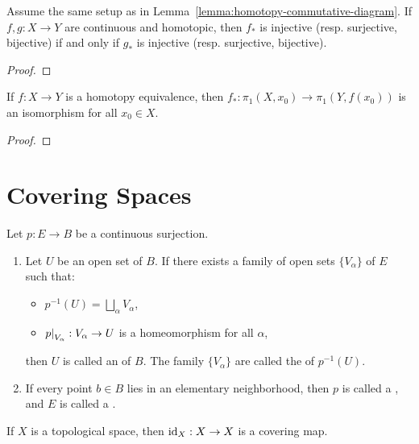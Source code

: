 \begin{corollary}
	Assume the same setup as in Lemma~\ref{lemma:homotopy-commutative-diagram}. If $f,g:X \rightarrow Y$ are continuous and homotopic, then  $f_\ast$ is injective (resp. surjective, bijective) if and only if  $g_\ast$ is injective (resp. surjective, bijective).
\end{corollary}

{\color{red}\begin{proof}
	
\end{proof}}

\begin{theorem}
	If $f:X \rightarrow Y$ is a homotopy equivalence, then $f_\ast:\pi_1(X,x_0) \rightarrow \pi_1(Y,f(x_0))$ is an isomorphism for all $x_0 \in X$.
\end{theorem}
{\color{red}\begin{proof}
	
\end{proof}}

\section{Covering Spaces}

\begin{definition}
	Let $p:E \rightarrow B$ be a  continuous surjection.
	\begin{enumerate}[label = (\alph*),itemsep=1pt,topsep=3pt]
		\item Let $U$ be an open set of $B$. If there exists a family of open sets $\{V_\alpha\}$ of $E$ such that:
			\begin{itemize}[itemsep=1pt,topsep=3pt]
				\item $p^{-1}(U) = \bigsqcup_\alpha V_\alpha$,
				\item $\restr{p}{V_\alpha}:V_\alpha \rightarrow U$ is a homeomorphism for all $\alpha$,
			\end{itemize}
		then $U$ is called an  of $B$. The family $\{V_\alpha\}$ are called the  of $p^{-1}(U)$.

		\item If every point $b \in B$ lies in an elementary neighborhood, then $p$ is called a , and $E$ is called a .
	\end{enumerate}	
\end{definition}

\begin{example}
	If $X$ is a topological space, then $\operatorname{id}_X:X \rightarrow X$ is a covering map.
\end{example}

